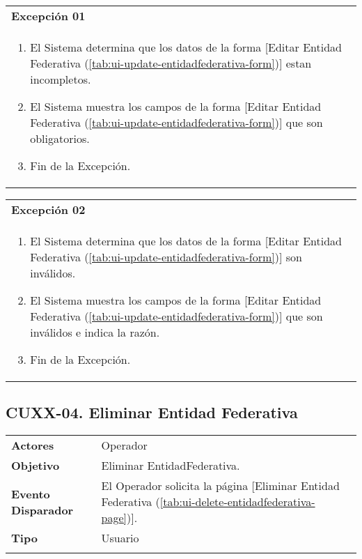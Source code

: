 \begin{tabular}{ p{15.5cm} }
	\textbf{Excepción 01} \\
	\begin{enumerate}
		\item El Sistema determina que los datos de la forma [Editar Entidad Federativa (\ref{tab:ui-update-entidadfederativa-form})] estan incompletos.
		\item El Sistema muestra los campos de la forma [Editar Entidad Federativa (\ref{tab:ui-update-entidadfederativa-form})] que son obligatorios.
		\item Fin de la Excepción.
	\end{enumerate}
\end{tabular}

\begin{tabular}{ p{15.5cm} }
	\textbf{Excepción 02} \\
	\begin{enumerate}
		\item El Sistema determina que los datos de la forma [Editar Entidad Federativa (\ref{tab:ui-update-entidadfederativa-form})] son inválidos.
		\item El Sistema muestra los campos de la forma [Editar Entidad Federativa (\ref{tab:ui-update-entidadfederativa-form})] que son inválidos e indica la razón.
		\item Fin de la Excepción.
	\end{enumerate}
\end{tabular}


\clearpage
\subsection{CUXX-04. Eliminar Entidad Federativa} \label{sec:cu-delete-EntidadFederativa}

\begin{tabular}{ p{3.5cm} p{11.5cm} }
	\textbf{Actores} & Operador\\
	\textbf{Objetivo} & Eliminar EntidadFederativa.\\
	\textbf{Evento Disparador} & El Operador solicita la página [Eliminar Entidad Federativa (\ref{tab:ui-delete-entidadfederativa-page})].\\
	\textbf{Tipo} & Usuario\\
	\\
\end{tabular}

